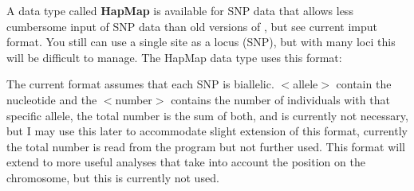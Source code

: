 \vskip 0.5cm
A data type called \textbf{HapMap} is available for SNP data that allows less cumbersome input of SNP data than old versions of \migrate, but see current imput format.
You still can use a single site as a locus (SNP), but with many loci this will be difficult to manage. The HapMap data type uses this format:
 \begin{small}
\end{small}
The current format assumes that each SNP is biallelic. $<$allele$>$ contain the nucleotide and the $<$number$>$ contains the number of individuals with that specific allele, the total number is the sum of both,
and is currently not necessary, but I may use this later to accommodate slight extension of this format, currently the total number is read from the program but not further used. This format will extend to more useful analyses that take into account the position on the chromosome, but this is currently not used.
